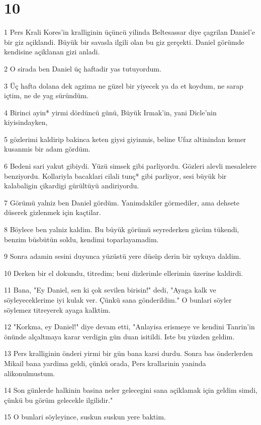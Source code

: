 \chapter{10}

\par 1 Pers Krali Kores'in kralliginin üçüncü yilinda Beltesassar diye çagrilan Daniel'e bir giz açiklandi. Büyük bir savasla ilgili olan bu giz gerçekti. Daniel görümde kendisine açiklanan gizi anladi.
\par 2 O sirada ben Daniel üç haftadir yas tutuyordum.
\par 3 Üç hafta dolana dek agzima ne güzel bir yiyecek ya da et koydum, ne sarap içtim, ne de yag süründüm.
\par 4 Birinci ayin* yirmi dördüncü günü, Büyük Irmak'in, yani Dicle'nin kiyisindayken,
\par 5 gözlerimi kaldirip bakinca keten giysi giyinmis, beline Ufaz altinindan kemer kusanmis bir adam gördüm.
\par 6 Bedeni sari yakut gibiydi. Yüzü simsek gibi parliyordu. Gözleri alevli mesalelere benziyordu. Kollariyla bacaklari cilali tunç* gibi parliyor, sesi büyük bir kalabaligin çikardigi gürültüyü andiriyordu.
\par 7 Görümü yalniz ben Daniel gördüm. Yanimdakiler görmediler, ama dehsete düserek gizlenmek için kaçtilar.
\par 8 Böylece ben yalniz kaldim. Bu büyük görümü seyrederken gücüm tükendi, benzim büsbütün soldu, kendimi toparlayamadim.
\par 9 Sonra adamin sesini duyunca yüzüstü yere düsüp derin bir uykuya daldim.
\par 10 Derken bir el dokundu, titredim; beni dizlerimle ellerimin üzerine kaldirdi.
\par 11 Bana, "Ey Daniel, sen ki çok sevilen birisin!" dedi, "Ayaga kalk ve söyleyeceklerime iyi kulak ver. Çünkü sana gönderildim." O bunlari söyler söylemez titreyerek ayaga kalktim.
\par 12 "Korkma, ey Daniel!" diye devam etti, "Anlayisa erismeye ve kendini Tanrin'in önünde alçaltmaya karar verdigin gün duan isitildi. Iste bu yüzden geldim.
\par 13 Pers kralliginin önderi yirmi bir gün bana karsi durdu. Sonra bas önderlerden Mikail bana yardima geldi, çünkü orada, Pers krallarinin yaninda alikonulmustum.
\par 14 Son günlerde halkinin basina neler gelecegini sana açiklamak için geldim simdi, çünkü bu görüm gelecekle ilgilidir."
\par 15 O bunlari söyleyince, suskun suskun yere baktim.
